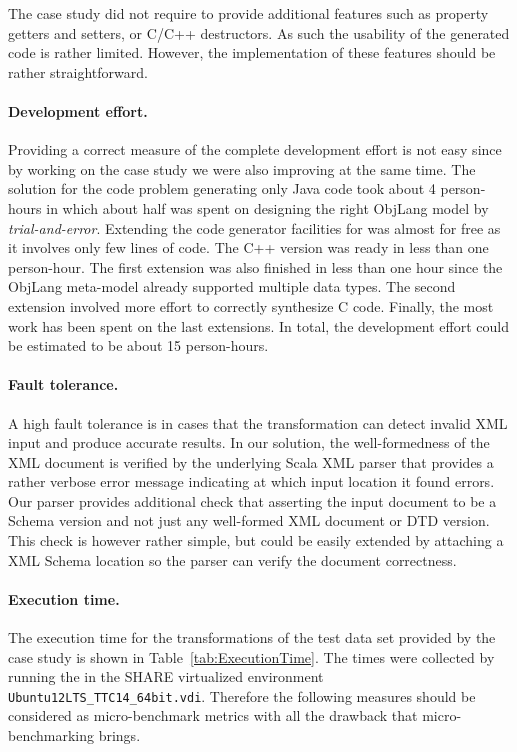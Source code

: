 The case study did not require to provide additional features such as property getters and setters, or C/C++ destructors.
As such the usability of the generated code is rather limited.
However, the implementation of these features should be rather straightforward.

\paragraph{Development effort.}

Providing a correct measure of the complete development effort is not easy since by working on the case study we were also improving \SIGMA at the same time.
The solution for the code problem generating only Java code took about 4 person-hours in which about half was spent on designing the right ObjLang model by \emph{trial-and-error}.
Extending the code generator facilities for \Csharp was almost for free as it involves only few lines of code.
The C++ version was ready in less than one person-hour.
The first extension was also finished in less than one hour since the ObjLang meta-model already supported multiple data types.
The second extension involved more effort to correctly synthesize C code.
Finally, the most work has been spent on the last extensions.
In total, the development effort could be estimated to be about 15 person-hours.

\paragraph{Fault tolerance.}
%
A high fault tolerance is in cases that the transformation can detect invalid XML input and produce accurate results.
In our solution, the well-formedness of the XML document is verified by the underlying Scala XML parser that provides a rather verbose error message indicating at which input location it found errors.
Our parser provides additional check that asserting the input document to be a  Schema version and not just any well-formed XML document or \FIXML DTD version.
This check is however rather simple, but could be easily extended by attaching a \FIXML XML Schema location so the parser can verify the document correctness.

\paragraph{Execution time.}

The execution time for the transformations of the test data set provided by the case study is shown in Table~\ref{tab:ExecutionTime}.
The times were collected by running the in the SHARE virtualized environment \texttt{Ubuntu12LTS\_TTC14\_64bit\SIGMA.vdi}.
Therefore the following measures should be considered as micro-benchmark metrics with all the drawback that micro-benchmarking brings.

